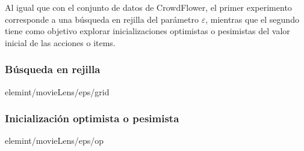Al igual que con el conjunto de datos de CrowdFlower, el primer experimento corresponde a una búsqueda en rejilla del parámetro $\varepsilon$, mientras que el segundo tiene como objetivo explorar inicializaciones optimistas o pesimistas del valor inicial de las acciones o items.


\subsubsection{Búsqueda en rejilla\label{SSS:EPSMLGRID}}{elemint/movieLens/eps/grid}

\subsubsection{Inicialización optimista o pesimista\label{SSS:EPSMLOP}}{elemint/movieLens/eps/op}